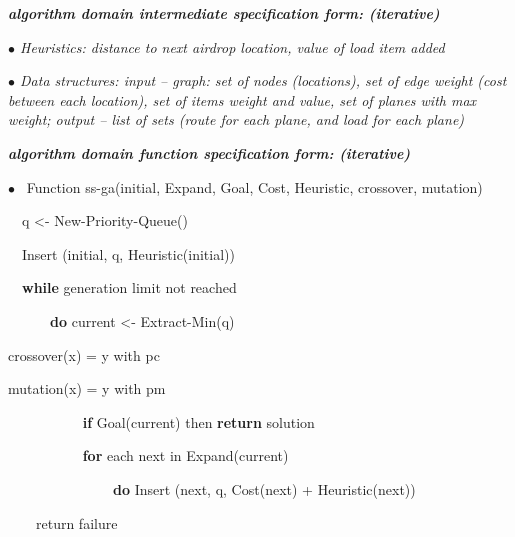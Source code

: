 \documentclass[journal]{IEEEtran}
\begin{document}
\setlength{\parskip}{0.0pt}

\tab \textbf{\textit{algorithm domain intermediate speciﬁcation form: (iterative)}}\par

\textit{$\bullet$  Heuristics: distance to next airdrop location, value of load item added}\par

\textit{$\bullet$  Data structures: input – graph: set of nodes (locations), set of edge weight (cost between each location), set of items weight and value, set of planes with max weight; output – list of sets (route for each plane, and load for each plane)}\par

\vspace{\baselineskip}

\textbf{\textit{algorithm domain function speciﬁcation form:  (iterative)}}\par

\textit{$\bullet$  }\  Function ss-ga(initial, Expand, Goal, Cost, Heuristic, crossover, mutation)\par

\ \  q <- New-Priority-Queue()\par

\ \  Insert (initial, q, Heuristic(initial))\par

\ \  \textbf{while} generation limit not reached\par

\ \ \ \ \ \  \textbf{do} current <- Extract-Min(q)\par

\tab crossover(x) = y with pc\par

\tab mutation(x) = y with pm\par

\ \ \ \ \ \ \ \ \ \  \textbf{ if} Goal(current) then \textbf{return} solution\par

\ \ \ \ \ \ \ \ \ \  \textbf{ for} each next in Expand(current)\par

\ \ \ \ \ \ \ \ \ \ \ \ \ \ \  \textbf{do} Insert (next, q, Cost(next) + Heuristic(next))\par

\ \ \ \  return failure\par



\end{document}
